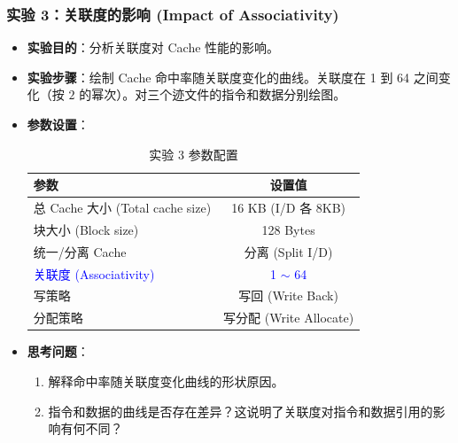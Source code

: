 \documentclass[12pt,a4paper]{article}
\begin{document}
\subsubsection{实验 3：关联度的影响 (Impact of Associativity)}
\begin{itemize}
    \item \textbf{实验目的}：分析关联度对 Cache 性能的影响。
    \item \textbf{实验步骤}：绘制 Cache 命中率随关联度变化的曲线。关联度在 1 到 64 之间变化（按 $2$ 的幂次）。对三个迹文件的指令和数据分别绘图。
    \item \textbf{参数设置}：
    
    \begin{table}[H]
    \centering
    \small
    \begin{tabular}{lc}
    \toprule
    \textbf{参数} & \textbf{设置值} \\
    \midrule
    总 Cache 大小 (Total cache size) & 16 KB (I/D 各 8KB) \\
    块大小 (Block size) & 128 Bytes \\
    统一/分离 Cache & 分离 (Split I/D) \\
    \textcolor{blue}{关联度 (Associativity)} & \textcolor{blue}{1 $\sim$ 64} \\
    写策略 & 写回 (Write Back) \\
    分配策略 & 写分配 (Write Allocate) \\
    \bottomrule
    \end{tabular}
    \caption{实验 3 参数配置}
    \end{table}
    \item \textbf{思考问题}：
    \begin{enumerate}
        \item 解释命中率随关联度变化曲线的形状原因。
        \item 指令和数据的曲线是否存在差异？这说明了关联度对指令和数据引用的影响有何不同？
    \end{enumerate}
\end{itemize}
\end{document}

